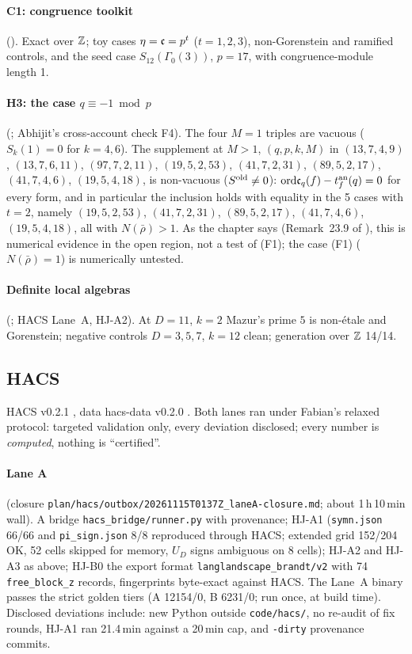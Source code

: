 \paragraph{C1: congruence toolkit} (). Exact over $\mathbb{Z}$; toy cases $\eta=\mathfrak{c}=p^t$ ($t=1,2,3$), non-Gorenstein
and ramified controls, and the seed case $S_{12}(\Gamma_0(3))$, $p=17$, with congruence-module length 1.

\paragraph{H3: the case $q\equiv-1\bmod p$} (; Abhijit's cross-account check F4). The four $M=1$ triples
are vacuous ($S_k(1)=0$ for $k=4,6$). The supplement at $M>1$, $(q,p,k,M)$ in
$(13,7,4,9)$, $(13,7,6,11)$, $(97,7,2,11)$, $(19,5,2,53)$, $(41,7,2,31)$, $(89,5,2,17)$, $(41,7,4,6)$, $(19,5,4,18)$, is non-vacuous
($S^{\rm old}\ne0$): $\mathrm{ord}\mathfrak{c}_q(f)-t^{\rm an}_f(q)=0$ for every form, and in particular the inclusion holds with equality in the
5 cases with $t=2$, namely $(19,5,2,53)$, $(41,7,2,31)$, $(89,5,2,17)$, $(41,7,4,6)$, $(19,5,4,18)$, all with $N(\bar\rho)>1$.
As the chapter says (Remark~23.9 of \mainpdf), this is numerical evidence in the open region, not a test of (F1); the case
(F1) ($N(\bar\rho)=1$) is numerically untested.

\paragraph{Definite local algebras} (; HACS Lane~A, HJ-A2). At $D=11$, $k=2$ Mazur's prime $5$ is
non-\'etale and Gorenstein; negative controls $D=3,5,7$, $k=12$ clean; generation over $\mathbb{Z}$ 14/14.

\subsection{HACS}\label{ss:hacs}
HACS v0.2.1 \cite{HACS021}, data hacs-data v0.2.0 \cite{HACSdata020}. Both lanes ran under Fabian's relaxed protocol:
targeted validation only, every deviation disclosed; every number is \emph{computed}, nothing is ``certified''.

\paragraph{Lane A} (closure \texttt{plan/hacs/outbox/20261115T0137Z\_laneA-closure.md}; about 1\,h\,10\,min wall).
A bridge \texttt{hacs\_bridge/runner.py} with provenance; HJ-A1  (\texttt{symn.json} 66/66 and
\texttt{pi\_sign.json} 8/8 reproduced through HACS; extended grid 152/204 OK, 52 cells skipped for memory, $U_D$ signs ambiguous
on 8 cells); HJ-A2 and HJ-A3 as above; HJ-B0 the export format \texttt{langlandscape\_brandt/v2} with 74 \texttt{free\_block\_z}
records, fingerprints byte-exact against HACS. The Lane~A binary passes the strict golden tiers (A 12154/0, B 6231/0; run once, at build time).
Disclosed deviations include: new Python outside \texttt{code/hacs/}, no re-audit of fix rounds, HJ-A1 ran 21.4\,min against a
20\,min cap, and \texttt{-dirty} provenance commits.

